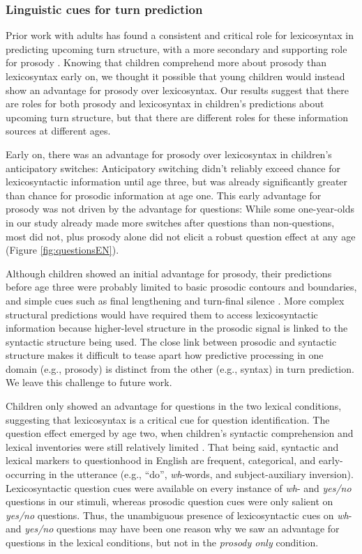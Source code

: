 \documentclass[authoryear, 12pt]{elsarticle}
\begin{document}
\subsubsection{Linguistic cues for turn prediction}

Prior work with adults has found a consistent and critical role for lexicosyntax in predicting upcoming turn structure, with a more secondary and supporting role for prosody \citep{de-ruiter2006, magyari2012}. Knowing that children comprehend more about prosody than lexicosyntax early on, we thought it possible that young children would instead show an advantage for prosody over lexicosyntax. Our results suggest that there are roles for both prosody and lexicosyntax in children's predictions about upcoming turn structure, but that there are different roles for these information sources at different ages.

Early on, there was an advantage for prosody over lexicosyntax in children's anticipatory switches: Anticipatory switching didn't reliably exceed chance for lexicosyntactic information  until age three, but was already significantly greater than chance for prosodic information  at age one. This early advantage for prosody was not driven by the advantage for questions: While some one-year-olds in our study already made more switches after questions than non-questions, most did not, plus prosody alone did not elicit a robust question effect at any age (Figure \ref{fig:questionsEN}).

Although children showed an initial advantage for prosody, their predictions before age three were probably limited to basic prosodic contours and boundaries, and simple cues such as final lengthening and turn-final silence \citep{pannekamp2006}. More complex structural predictions would have required them to access lexicosyntactic information because higher-level structure in the prosodic signal is linked to the syntactic structure being used. The close link between prosodic and syntactic structure makes it difficult to tease apart how predictive processing in one domain (e.g., prosody) is distinct from the other (e.g., syntax) in turn prediction. We leave this challenge to future work.

Children only showed an advantage for questions in the two lexical conditions, suggesting that lexicosyntax is a critical cue for question identification. The question effect emerged by age two, when children's syntactic comprehension and lexical inventories were still relatively limited \citep{clark2009}. That being said, syntactic and lexical markers to questionhood in English are frequent, categorical, and early-occurring in the utterance (e.g., ``do'', \textit{wh}-words, and subject-auxiliary inversion). Lexicosyntactic question cues were available on every instance of \textit{wh}- and \textit{yes/no} questions in our stimuli, whereas prosodic question cues were only salient on \textit{yes/no} questions. Thus, the unambiguous presence of lexicosyntactic cues on \textit{wh}- and \textit{yes/no} questions may have been one reason why we saw an advantage for questions in the lexical conditions, but not in the \textit{prosody only} condition.
\end{document}
